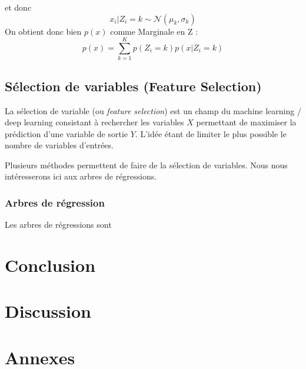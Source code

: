 \documentclass{article}
\begin{document}
	et donc 
	\[
	x_i | Z_i = k \sim \mathcal{N}(\mu_k, \sigma_k)
	\]
	On obtient donc bien $p(x)$ comme Marginale en Z : 
	\[
	p(x) = \sum_{k=1}^{K} p(Z_i = k)p(x|Z_i=k)
	\]
	\subsection{Sélection de variables (Feature Selection)}
	La sélection de variable (ou \textit{feature selection}) est un champ du machine learning / deep learning consistant à rechercher les variables $X$ permettant de maximiser la prédiction d'une variable de sortie $Y$. L'idée étant de limiter le plus possible le nombre de variables d'entrées.
	
	Plusieurs méthodes permettent de faire de la sélection de variables. Nous nous intéresserons ici aux arbres de régressions.
	
	\subsubsection{Arbres de régression}
	Les arbres de régressions sont 
	\clearpage
	\section{Conclusion}
	
	\clearpage
	\section{Discussion}
	
	\clearpage
	\section*{Annexes}
	
	
	\clearpage
	\printbibliography
\end{document}
